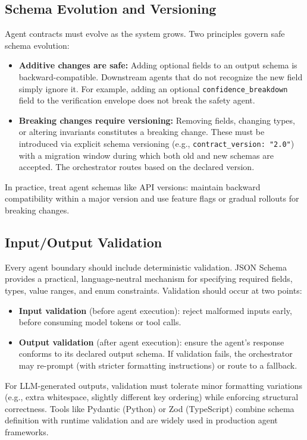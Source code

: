 \subsection{Schema Evolution and Versioning}
Agent contracts must evolve as the system grows. Two principles govern safe schema evolution:
\begin{itemize}[leftmargin=1.5em, itemsep=2pt]
  \item \textbf{Additive changes are safe:} Adding optional fields to an output schema is backward-compatible. Downstream agents that do not recognize the new field simply ignore it. For example, adding an optional \texttt{confidence\_breakdown} field to the verification envelope does not break the safety agent.
  \item \textbf{Breaking changes require versioning:} Removing fields, changing types, or altering invariants constitutes a breaking change. These must be introduced via explicit schema versioning (e.g., \texttt{contract\_version: "2.0"}) with a migration window during which both old and new schemas are accepted. The orchestrator routes based on the declared version.
\end{itemize}
In practice, treat agent schemas like API versions: maintain backward compatibility within a major version and use feature flags or gradual rollouts for breaking changes.

\subsection{Input/Output Validation}
Every agent boundary should include deterministic validation. JSON Schema provides a practical, language-neutral mechanism for specifying required fields, types, value ranges, and enum constraints. Validation should occur at two points:
\begin{itemize}[leftmargin=1.5em, itemsep=2pt]
  \item \textbf{Input validation} (before agent execution): reject malformed inputs early, before consuming model tokens or tool calls.
  \item \textbf{Output validation} (after agent execution): ensure the agent's response conforms to its declared output schema. If validation fails, the orchestrator may re-prompt (with stricter formatting instructions) or route to a fallback.
\end{itemize}
For LLM-generated outputs, validation must tolerate minor formatting variations (e.g., extra whitespace, slightly different key ordering) while enforcing structural correctness. Tools like Pydantic (Python) or Zod (TypeScript) combine schema definition with runtime validation and are widely used in production agent frameworks.

